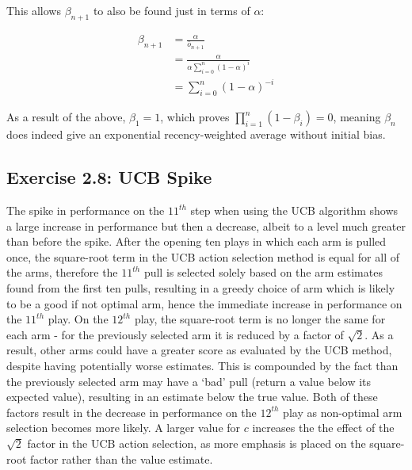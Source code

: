 This allows $\beta_{n+1}$ to also be found just in terms of $\alpha$:

\vspace{-6mm}
\begin{align*}
\beta_{n+1} &= \frac{\alpha}{\bar{o}_{n+1}} \\
&= \frac{\alpha}{\alpha\sum_{i=0}^{n}(1-\alpha)^i} \\
&= \sum_{i=0}^{n}(1-\alpha)^{-i}
\end{align*}

As a result of the above, $\beta_1 = 1$, which proves $\prod_{i=1}^{n}(1-\beta_i) = 0$, meaning $\beta_n$ does indeed give an exponential recency-weighted average without initial bias.

\subsection*{Exercise 2.8: UCB Spike}

The spike in performance on the $11^{th}$ step when using the UCB algorithm shows a large increase in performance but then a decrease, albeit to a level much greater than before the spike. After the opening ten plays in which each arm is pulled once, the square-root term in the UCB action selection method is equal for all of the arms, therefore the $11^{th}$ pull is selected solely based on the arm estimates found from the first ten pulls, resulting in a greedy choice of arm which is likely to be a good if not optimal arm, hence the immediate increase in performance on the $11^{th}$ play. On the $12^{th}$ play, the square-root term is no longer the same for each arm - for the previously selected arm it is reduced by a factor of $\sqrt{2}$. As a result, other arms could have a greater score as evaluated by the UCB method, despite having potentially worse estimates. This is compounded by the fact than the previously selected arm may have a `bad' pull (return a value below its expected value), resulting in an estimate below the true value. Both of these factors result in the decrease in performance on the $12^{th}$ play as non-optimal arm selection becomes more likely. A larger value for $c$ increases the the effect of the $\sqrt{2}$ factor in the UCB action selection, as more emphasis is placed on the square-root factor rather than the value estimate. 
